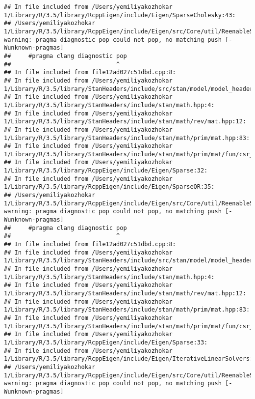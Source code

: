\documentclass[]{article}
\begin{document}
\begin{verbatim}
## In file included from /Users/yemiliyakozhokar 1/Library/R/3.5/library/RcppEigen/include/Eigen/SparseCholesky:43:
## /Users/yemiliyakozhokar 1/Library/R/3.5/library/RcppEigen/include/Eigen/src/Core/util/ReenableStupidWarnings.h:10:30: warning: pragma diagnostic pop could not pop, no matching push [-Wunknown-pragmas]
##     #pragma clang diagnostic pop
##                              ^
## In file included from file12ad027c51dbd.cpp:8:
## In file included from /Users/yemiliyakozhokar 1/Library/R/3.5/library/StanHeaders/include/src/stan/model/model_header.hpp:4:
## In file included from /Users/yemiliyakozhokar 1/Library/R/3.5/library/StanHeaders/include/stan/math.hpp:4:
## In file included from /Users/yemiliyakozhokar 1/Library/R/3.5/library/StanHeaders/include/stan/math/rev/mat.hpp:12:
## In file included from /Users/yemiliyakozhokar 1/Library/R/3.5/library/StanHeaders/include/stan/math/prim/mat.hpp:83:
## In file included from /Users/yemiliyakozhokar 1/Library/R/3.5/library/StanHeaders/include/stan/math/prim/mat/fun/csr_extract_u.hpp:6:
## In file included from /Users/yemiliyakozhokar 1/Library/R/3.5/library/RcppEigen/include/Eigen/Sparse:32:
## In file included from /Users/yemiliyakozhokar 1/Library/R/3.5/library/RcppEigen/include/Eigen/SparseQR:35:
## /Users/yemiliyakozhokar 1/Library/R/3.5/library/RcppEigen/include/Eigen/src/Core/util/ReenableStupidWarnings.h:10:30: warning: pragma diagnostic pop could not pop, no matching push [-Wunknown-pragmas]
##     #pragma clang diagnostic pop
##                              ^
## In file included from file12ad027c51dbd.cpp:8:
## In file included from /Users/yemiliyakozhokar 1/Library/R/3.5/library/StanHeaders/include/src/stan/model/model_header.hpp:4:
## In file included from /Users/yemiliyakozhokar 1/Library/R/3.5/library/StanHeaders/include/stan/math.hpp:4:
## In file included from /Users/yemiliyakozhokar 1/Library/R/3.5/library/StanHeaders/include/stan/math/rev/mat.hpp:12:
## In file included from /Users/yemiliyakozhokar 1/Library/R/3.5/library/StanHeaders/include/stan/math/prim/mat.hpp:83:
## In file included from /Users/yemiliyakozhokar 1/Library/R/3.5/library/StanHeaders/include/stan/math/prim/mat/fun/csr_extract_u.hpp:6:
## In file included from /Users/yemiliyakozhokar 1/Library/R/3.5/library/RcppEigen/include/Eigen/Sparse:33:
## In file included from /Users/yemiliyakozhokar 1/Library/R/3.5/library/RcppEigen/include/Eigen/IterativeLinearSolvers:46:
## /Users/yemiliyakozhokar 1/Library/R/3.5/library/RcppEigen/include/Eigen/src/Core/util/ReenableStupidWarnings.h:10:30: warning: pragma diagnostic pop could not pop, no matching push [-Wunknown-pragmas]

\end{verbatim}
\end{document}

